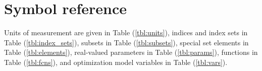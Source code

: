 \newcommand{\notationtable}[4] {
  {
    \tabulinesep=3pt
    \begin{center}
      \begin{longtabu} to \linewidth {lX[L]}

        \caption[
        ]{
          #3 %
          #4 %
        } \\
        \toprule
        #2 %
        \midrule
        \endfirsthead

        \caption{Continued} \\
        \toprule
        #2 %
        \midrule
        \endhead

        \bottomrule
        \endfoot

        \bottomrule
        \endlastfoot
        
        #1 %
      \end{longtabu}
    \end{center}
  }
}

\chapter{Symbol reference}\label{chap:symbref}

Units of measurement are given in Table (\ref{tbl:units}),
indices and index sets in Table (\ref{tbl:index_sets}),
subsets in Table (\ref{tbl:subsets}),
special set elements in Table (\ref{tbl:elements}),
real-valued parameters in Table (\ref{tbl:params}),
functions in Table (\ref{tbl:fcns}),
and optimization model variables in Table (\ref{tbl:vars}).

